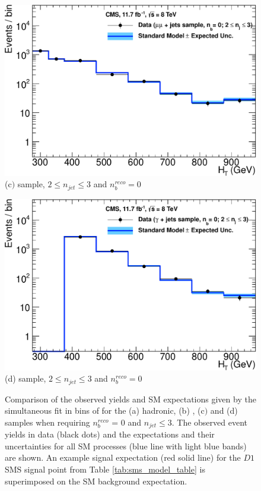 \begin{figure}[ht]
\begin{minipage}[b]{0.48 \linewidth}
\includegraphics[width = 1.0\linewidth]{plots/mumu_0b_le3j_logy.pdf}
\centering (c$)$ \dimupjets sample, $2 \leq n_{jet} \leq 3$ and $n_{b}^{reco} = 0$ 
\end{minipage}
\quad
\begin{minipage}[b]{0.48\linewidth}
\includegraphics[width = 1.0\linewidth]{plots/photon_0b_le3j_logy.pdf}
\centering (d)  \gpjets sample, $2 \leq n_{jet} \leq 3$ and $n_{b}^{reco} = 0$ 
\end{minipage}
\caption[Comparison of the observed yields and \ac{SM} expectations given by the simultaneous fit in bins of \theht for the (a) hadronic, (b) \mupjets, (c$)$ \dimupjets and (d) \gpjets samples when requiring $n_{b}^{reco}$ = 0 and $n_{jet} \leq 3$.]{Comparison of the observed yields and \ac{SM} expectations given by the simultaneous fit in bins of \theht for the (a) hadronic, (b) \mupjets, (c$)$ \dimupjets and (d) \gpjets samples when requiring $n_{b}^{reco}$ = 0 and $n_{jet} \leq 3$. The observed event yields in data (black dots) and the expectations and their uncertainties for all SM processes (blue line with light blue bands) are shown. An example signal expectation (red solid line) for the $D1$ \ac{SMS} signal point from Table \ref{tab:sms_model_table} is superimposed on the \ac{SM} background expectation.}
\label{fig:result0blow}
\end{figure}

